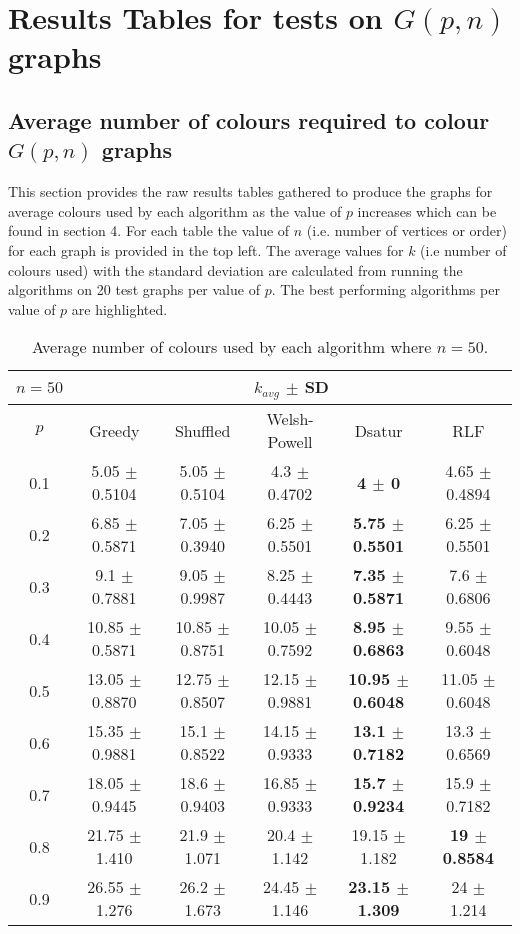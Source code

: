 \section{Results Tables for tests on $G(p,n)$ graphs}

\subsection{Average number of colours required to colour $G(p,n)$ graphs}

This section provides the raw results tables gathered to produce the graphs for average colours used by each algorithm as the value of $p$ increases which can be found in section 4. For each table the value of $n$ (i.e. number of vertices or order) for each graph is provided in the top left. The average values for $k$ (i.e number of colours used) with the standard deviation are calculated from running the algorithms on 20 test graphs per value of $p$. The best performing algorithms per value of $p$ are highlighted. 

\begin{table}[H]
    \centering
    \begin{tabular}{cccccc}
        
        $n = 50$& \multicolumn{5}{c}{$k_{avg}$ $\pm$ SD} \\
        \hline
        $p$ & Greedy & Shuffled & Welsh-Powell & Dsatur & RLF \\
        \hline
        0.1 & 5.05 $\pm$ 0.5104 & 5.05 $\pm$ 0.5104 & 4.3 $\pm$ 0.4702 & \textbf{4 $\pm$ 0} & 4.65 $\pm$ 0.4894 \\
        0.2 & 6.85 $\pm$ 0.5871 & 7.05 $\pm$ 0.3940 & 6.25 $\pm$ 0.5501 & \textbf{5.75 $\pm$ 0.5501} & 6.25 $\pm$ 0.5501 \\
        0.3 & 9.1 $\pm$ 0.7881 & 9.05 $\pm$ 0.9987 & 8.25 $\pm$ 0.4443 & \textbf{7.35 $\pm$ 0.5871} & 7.6 $\pm$ 0.6806 \\
        0.4 & 10.85 $\pm$ 0.5871 & 10.85 $\pm$ 0.8751 & 10.05 $\pm$ 0.7592 & \textbf{8.95 $\pm$ 0.6863} & 9.55 $\pm$ 0.6048 \\
        0.5 & 13.05 $\pm$ 0.8870 & 12.75 $\pm$ 0.8507 & 12.15 $\pm$ 0.9881 & \textbf{10.95 $\pm$ 0.6048} & 11.05 $\pm$ 0.6048 \\
        0.6 & 15.35 $\pm$ 0.9881 & 15.1 $\pm$ 0.8522 & 14.15 $\pm$ 0.9333 & \textbf{13.1 $\pm$ 0.7182} & 13.3 $\pm$ 0.6569 \\
        0.7 & 18.05 $\pm$ 0.9445 & 18.6 $\pm$ 0.9403 & 16.85 $\pm$ 0.9333 & \textbf{15.7 $\pm$ 0.9234} & 15.9 $\pm$ 0.7182 \\
        0.8 & 21.75 $\pm$ 1.410 & 21.9 $\pm$ 1.071 & 20.4 $\pm$ 1.142 & 19.15 $\pm$ 1.182 & \textbf{19 $\pm$ 0.8584} \\
        0.9 & 26.55 $\pm$ 1.276 & 26.2 $\pm$ 1.673 & 24.45 $\pm$ 1.146 & \textbf{23.15 $\pm$ 1.309} & 24 $\pm$ 1.214 \\
        \hline
    \end{tabular}
    \caption{Average number of colours used by each algorithm where $n = 50$.}
    \label{tab:avgKforV50}
\end{table}


